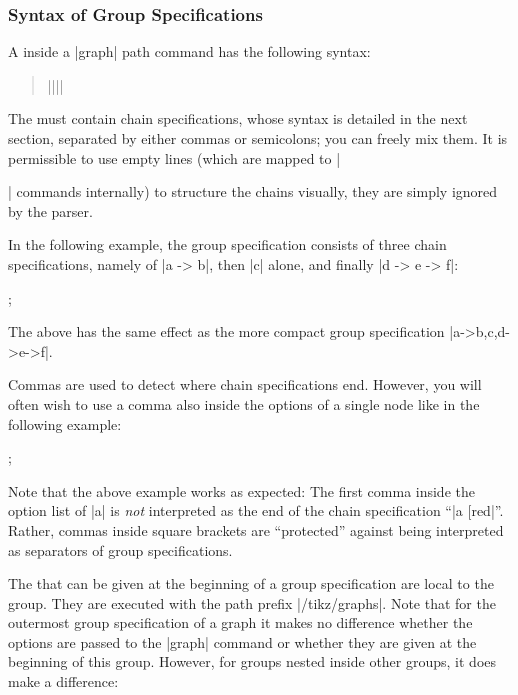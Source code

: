 \subsubsection{Syntax of Group Specifications}
\label{section-library-graphs-group-spec}

A  inside a |graph| path command has the
following syntax:
\begin{quote}
  |{||}|
\end{quote}
The  must contain chain specifications,
whose syntax is detailed in the next section, separated by either
commas or semicolons; you can freely mix them.
It is permissible to use empty lines (which are mapped to |\par|
commands internally) to structure the chains visually, they are simply
ignored by the parser. 

In the following example, the group specification consists of three
chain specifications, namely of |a -> b|, then |c| alone, and finally
|d -> e -> f|:
\begin{codeexample}[]
\tikz {};
\end{codeexample}
The above has the same effect as the more compact group specification
|{a->b,c,d->e->f}|.

Commas are used to detect where chain specifications end. However, you
will often wish to use a comma also inside the options of a single
node like in the following example:

\begin{codeexample}[]
\tikz {};
\end{codeexample}

Note that the above example works as expected: The first comma inside
the option list of |a| is \emph{not} interpreted as the end of the
chain specification ``|a [red|''. Rather, commas inside square
brackets are ``protected'' against being interpreted as separators of
group specifications.


The  that can be given at the beginning of a group
specification are local to the group. They are executed with the path
prefix |/tikz/graphs|. Note that for the outermost group specification
of a graph it makes no difference whether the options are passed to
the |graph| command or whether they are given at the beginning of this
group. However, for groups nested inside other groups, it does make a
difference:

